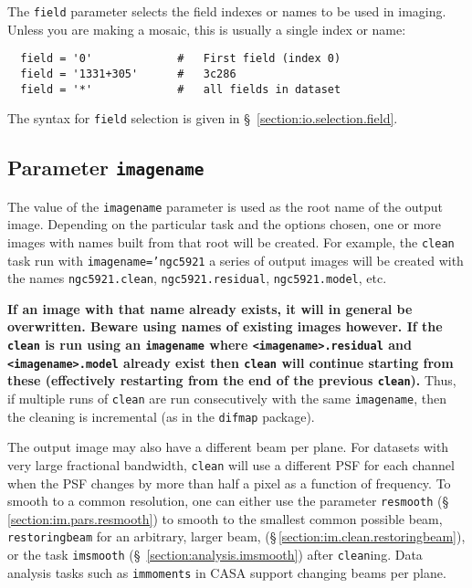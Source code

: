 The {\tt field} parameter selects the field indexes or names
to be used in imaging.  Unless you are making a mosaic, this
is usually a single index or name:
\small
\begin{verbatim}
  field = '0'             #   First field (index 0)
  field = '1331+305'      #   3c286
  field = '*'             #   all fields in dataset
\end{verbatim}
\normalsize

The syntax for {\tt field} selection is given in 
\S~\ref{section:io.selection.field}.

\subsection{Parameter {\tt imagename} }
\label{section:im.pars.imagename}

The value of the {\tt imagename} parameter is used as the root name
of the output image.  Depending on the particular task and the
options chosen, one or more images with names built from that root
will be created.  
For example, the {\tt clean} task run with
{\tt imagename='ngc5921} 
a series of output images will be created with the names
{\tt ngc5921.clean}, {\tt ngc5921.residual}, {\tt ngc5921.model}, etc.

{\bf If an image with that name already exists, it will in general
be overwritten.  Beware using names of existing images however.
If the {\tt clean} is run using an {\tt imagename} where 
{\tt <imagename>.residual} and {\tt <imagename>.model} already
exist then {\tt clean} will continue starting from these
(effectively restarting from the end of the previous {\tt clean}).} 
Thus, if multiple runs of {\tt clean} are run consecutively
with the same {\tt imagename}, then the cleaning is incremental
(as in the {\tt difmap} package).

The output image may also have a different beam per plane. For
datasets with very large fractional bandwidth, {\tt clean} will use a
different PSF for each channel when the PSF changes by more than half
a pixel as a function of frequency. To smooth to a common resolution,
one can either use the parameter {\tt resmooth}
(\S\,\ref{section:im.pars.resmooth}) to smooth to the smallest common
possible beam, {\tt restoringbeam} for an arbitrary, larger beam,
(\S\,\ref{section:im.clean.restoringbeam}), or the task {\tt imsmooth}
(\S~\ref{section:analysis.imsmooth}) after {\tt clean}ing. Data
analysis tasks such as {\tt immoments} in CASA support changing beams
per plane.


